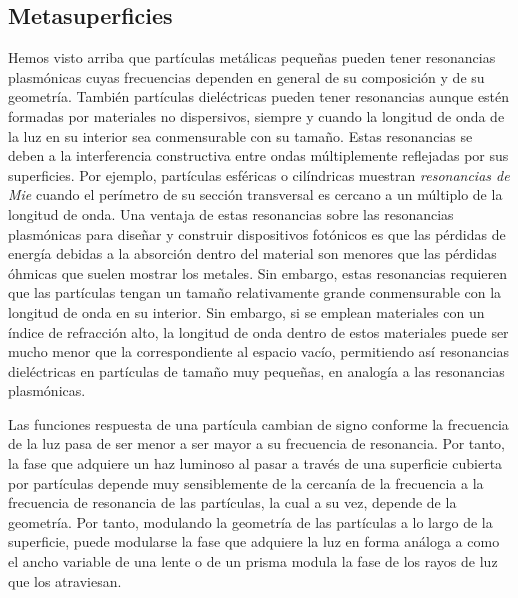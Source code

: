 \documentclass[12pt]{article}
\begin{document}
\subsection{Metasuperficies}
Hemos visto arriba que partículas metálicas pequeñas pueden tener
resonancias plasmónicas cuyas frecuencias dependen en general de su
composición y de su geometría. También partículas dieléctricas pueden
tener resonancias aunque estén formadas por materiales no dispersivos,
siempre y cuando la longitud de onda de la luz en su interior sea
conmensurable con su tamaño. Estas resonancias se deben a la
interferencia constructiva entre ondas múltiplemente reflejadas por
sus superficies. Por ejemplo, partículas esféricas o cilíndricas
muestran {\em resonancias de Mie} cuando el perímetro de su sección
transversal es cercano a un múltiplo de la longitud de onda.  Una
ventaja de estas resonancias sobre las resonancias plasmónicas para
diseñar y construir dispositivos fotónicos es que las pérdidas de
energía debidas a la absorción dentro del material son menores que las
pérdidas óhmicas que suelen mostrar los metales. Sin embargo, estas
resonancias requieren que las partículas tengan un tamaño
relativamente grande conmensurable con la longitud de onda en su
interior. Sin embargo, si se emplean materiales con un índice de
refracción alto, la longitud de onda dentro de estos materiales puede
ser mucho menor que la correspondiente al espacio vacío, permitiendo
así resonancias dieléctricas en partículas de tamaño muy pequeñas, en
analogía a las resonancias plasmónicas.

Las funciones respuesta de una partícula cambian de signo conforme la
frecuencia de la luz pasa de ser menor a ser mayor a su frecuencia de
resonancia. Por tanto, la fase que adquiere un haz luminoso al pasar a
través de una superficie cubierta por partículas depende muy
sensiblemente de la cercanía de la frecuencia a la frecuencia de
resonancia de las partículas, la cual a su vez, depende de la
geometría. Por tanto, modulando la geometría de las partículas a lo
largo de la superficie, puede modularse la fase que adquiere la luz en
forma análoga a como el ancho variable de una lente o de un prisma
modula la fase de los rayos de luz que los atraviesan.
\end{document}
